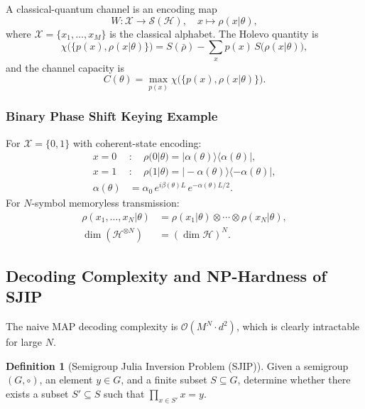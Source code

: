 \documentclass[journal,twocolumn]{IEEEtran}
\theoremstyle{definition}
\newtheorem{definition}{Definition}[section]
\theoremstyle{plain}
\newcommand{\tensor}{\otimes}
\begin{document}
A classical-quantum channel is an encoding map
\begin{equation}
  W:\mathcal{X}\to\mathcal{S}(\mathcal{H}),\quad
  x\mapsto\rho(x|\theta),
\end{equation}
where $\mathcal{X}=\{x_1,\dots,x_M\}$ is the classical alphabet. The
Holevo quantity is
\begin{equation}
  \chi\bigl(\{p(x),\rho(x|\theta)\}\bigr)=S(\bar\rho)
  -\sum_x p(x)\,S\bigl(\rho(x|\theta)\bigr),
\end{equation}
and the channel capacity is
\begin{equation}
  C(\theta)=\max_{p(x)}\chi\bigl(\{p(x),\rho(x|\theta)\}\bigr).
  \label{eq:holevo_capacity}
\end{equation}

\subsubsection{Binary Phase Shift Keying Example}

For $\mathcal{X}=\{0,1\}$ with coherent-state encoding:
\begin{align}
  x=0 &:\quad \rho(0|\theta)=|\alpha(\theta)\rangle\langle\alpha(\theta)|,\\
  x=1 &:\quad \rho(1|\theta)=|-\alpha(\theta)\rangle\langle-\alpha(\theta)|,\\
  \alpha(\theta) &= \alpha_0\,e^{i\beta(\theta)L}\,e^{-\alpha(\theta)L/2}.
\end{align}
For $N$-symbol memoryless transmission:
\begin{align}
  \rho(x_1,\dots,x_N|\theta) &=
  \rho(x_1|\theta)\tensor\cdots\tensor\rho(x_N|\theta),\nonumber\\
  \dim(\mathcal{H}^{\tensor N}) &= (\dim\mathcal{H})^N.
\end{align}

\subsection{Decoding Complexity and NP-Hardness of SJIP}
\label{sec:week1_complexity}

The naive MAP decoding complexity is $\mathcal{O}(M^N\cdot d^2)$, which
is clearly intractable for large $N$.

\begin{definition}[Semigroup Julia Inversion Problem (SJIP)]
Given a semigroup $(G,\circ)$, an element $y\in G$, and a finite subset
$S\subseteq G$, determine whether there exists a subset $S'\subseteq S$
such that $\prod_{x\in S'}x=y$.
\end{definition}
\end{document}
